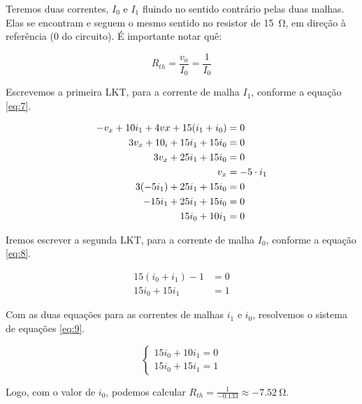 \documentclass{article}
\begin{document}
		Teremos duas correntes, $I_0$ e $I_1$ fluindo no sentido contrário pelas duas malhas. Elas se encontram e seguem o mesmo sentido no resistor de \SI{15}{\ohm}, em direção à referência (0 do circuito). É importante notar quê:
		
		$$
		R_{th} = \frac{v_a}{I_0} = \frac{1}{I_0}
		$$
		
		Escrevemos a primeira LKT, para a corrente de malha $I_1$, conforme a equação \ref{eq:7}. 
		
		\begin{equation}
			\centering
			\begin{aligned}
				-v_x + 10i_1 + 4vx +15(i_1 + i_0) &= 0 \\
				3v_x + 10_i + 15i_1 + 15i_0 &= 0 \\
				3v_x + 25i_1 + 15i_0 &= 0 \\
				v_x &= -5 \cdot i_1 \\
				3(-5i_1) + 25i_1 + 15i_0 &= 0 \\
				-15i_1 + 25i_1 + 15i_0 &= 0 \\
				15i_0 + 10i_1 &= 0
			\end{aligned}
			\label{eq:7}
		\end{equation}
		
		Iremos escrever a segunda LKT, para a corrente de malha $I_0$, conforme a equação \ref{eq:8}.
		
		\begin{equation}
			\begin{aligned}
				15(i_0 + i_1) - 1 &= 0 \\
				15i_0 + 15i_1 &= 1
			\end{aligned}
			\label{eq:8}
		\end{equation}
		
		Com as duas equações para as correntes de malhas $i_1$ e $i_0$, resolvemos o sistema de equações \ref{eq:9}.
		
		\begin{equation}
			\begin{cases}
				15i_0 + 10i_1 = 0 \\
				15i_0 + 15i_1 = 1
			\end{cases}
			\label{eq:9}
		\end{equation}
		
		Logo, com o valor de $i_0$, podemos calcular $R_{th} = \frac{1}{-0.133} \approx \SI{-7.52}{\ohm}$.
\end{document}
